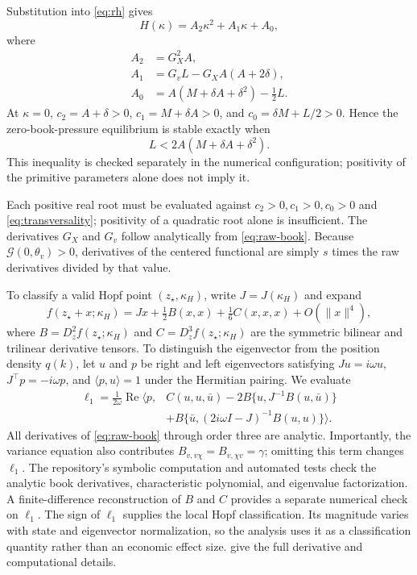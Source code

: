 \documentclass[11pt]{article}
\begin{document}
Substitution into \eqref{eq:rh} gives
\begin{equation}
H(\kappa)=A_2\kappa^2+A_1\kappa+A_0, \label{eq:hopf-quadratic}
\end{equation}
where
\begin{align}
A_2&=G_X^2A,\nonumber\\
A_1&=G_vL-G_XA(A+2\delta),\label{eq:hopf-coefficients}\\
A_0&=A(M+\delta A+\delta^2)-\tfrac12L.\nonumber
\end{align}
At $\kappa=0$, $c_2=A+\delta>0$, $c_1=M+\delta A>0$, and
$c_0=\delta M+L/2>0$.  Hence the zero-book-pressure equilibrium is stable exactly when
\begin{equation}
L<2A(M+\delta A+\delta^2). \label{eq:baseline-stability}
\end{equation}
This inequality is checked separately in the numerical configuration; positivity of the
primitive parameters alone does not imply it.

Each positive real root must be evaluated against
$c_2>0,c_1>0,c_0>0$ and \eqref{eq:transversality}; positivity of a quadratic root alone is
insufficient.  The derivatives $G_X$ and $G_v$ follow analytically
from \eqref{eq:raw-book}.  Because $\mathcal G(0,\theta_v)>0$, derivatives of the centered
functional are simply $s$ times the raw derivatives divided by that value.

To classify a valid Hopf point $(z_\star,\kappa_H)$, write $J=J(\kappa_H)$ and expand
\[
f(z_\star+x;\kappa_H)
=Jx+\tfrac12B(x,x)+\tfrac16C(x,x,x)+O(\|x\|^4),
\]
where $B=D_z^2f(z_\star;\kappa_H)$ and $C=D_z^3f(z_\star;\kappa_H)$ are the
symmetric bilinear and trilinear derivative tensors.  To distinguish the eigenvector from
the position density $q(k)$, let $u$ and $p$ be right and left eigenvectors satisfying
$Ju=i\omega u$, $J^\top p=-i\omega p$, and
$\langle p,u\rangle=1$ under the Hermitian pairing.  We evaluate
\begin{align}
\ell_1=\frac{1}{2\omega}\operatorname{Re}\Big\langle p,
&C(u,u,\bar u)-2B\{u,J^{-1}B(u,\bar u)\}\nonumber\\
&+B\{\bar u,(2i\omega I-J)^{-1}B(u,u)\}\Big\rangle.
\label{eq:l1}
\end{align}
All derivatives of \eqref{eq:raw-book} through order three are analytic.  Importantly, the
variance equation also contributes
$B_{v,v\chi}=B_{v,\chi v}=\gamma$; omitting this term changes $\ell_1$.  The repository's
symbolic computation and automated tests check the analytic book derivatives, characteristic
polynomial, and eigenvalue factorization.  A finite-difference reconstruction of $B$ and $C$
provides a separate numerical check on $\ell_1$.  The sign of $\ell_1$ supplies the local
Hopf classification.  Its magnitude varies with state and eigenvector normalization, so the
analysis uses it as a classification quantity rather than an economic effect size.
 give the full derivative
and computational details.
\end{document}
